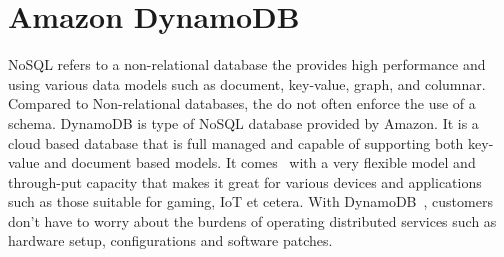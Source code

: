 \section{Amazon DynamoDB}

NoSQL refers to a non-relational database the provides high performance and using 
various data models such as document, key-value, graph, and columnar.  Compared 
to Non-relational databases, the do not often enforce the use of a schema. 
DynamoDB is type of NoSQL database provided by Amazon. It is a cloud based 
database that is full managed and capable of supporting both key-value and 
document based models. It comes~\cite{hid-sp18-512-amazon-dynamodb} with a 
very flexible model and through-put capacity that makes it great for various 
devices and applications such as those suitable for gaming, IoT et cetera. 
With DynamoDB~\cite{hid-sp18-512-amazon-dynamodb_faq}, customers don’t have 
to worry about the burdens of operating distributed services such as hardware 
setup, configurations and software patches.


